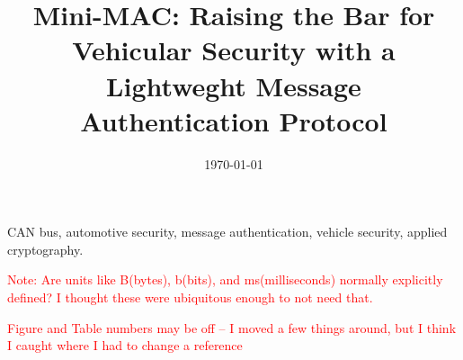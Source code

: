 \documentclass[10pt,final,conference,compsoc]{IEEEtran}
\begin{document}
\title{%
Mini-MAC: Raising the Bar for Vehicular Security with a Lightweght Message Authentication Protocol}


\author{
}
\date{\today}

\maketitle



\begin{IEEEkeywords}
	CAN bus,
	automotive security,
	message authentication,
	vehicle security,
	applied cryptography.
\end{IEEEkeywords}

\textcolor{red}{Note: Are units like B(bytes), b(bits), and ms(milliseconds) normally explicitly defined? I thought these were ubiquitous enough to not need that.}

\textcolor{red}{Figure and Table numbers may be off -- I moved a few things around, but I think I caught where I had to change a reference}
















	








\end{document}

